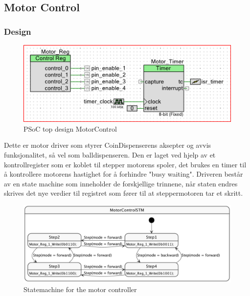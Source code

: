 \documentclass[Softwaredesign/Softwaredesign_main.tex]{subfiles}
\begin{document}
\subsection{Motor Control}\label{subsec:motorControlDesign}
\subsubsection{Design}
    \begin{figure}[H]
    \centering
    \includegraphics[width=\textwidth]{Softwaredesign/CoinSensor/graphics/TopDesign-MotorControl.png}
    \caption{PSoC top design MotorControl}
    \label{fig:MotorControl_PSoC_Design}
    \end{figure}
    Dette er motor driver som styrer CoinDispenserens aksepter og avvis funksjonalitet, så vel som balldispenseren. Den er laget ved hjelp av et kontrollregister som er koblet til stepper motorens spoler, det brukes en timer til å kontrollere motorens hastighet for å forhindre "busy waiting". Driveren består av en state machine som inneholder de forskjellige trinnene, når staten endres skrives det nye verdier til registret som fører til at steppermotoren tar et skritt.
    
    \begin{figure}
        \centering
        \includegraphics[width=\textwidth]{Softwaredesign/CoinSensor/graphics/MotorControlSTM.png}
        \caption{Statemachine for the motor controller}
        \label{fig:MotorControlSTM}
    \end{figure}
    
\end{document}
